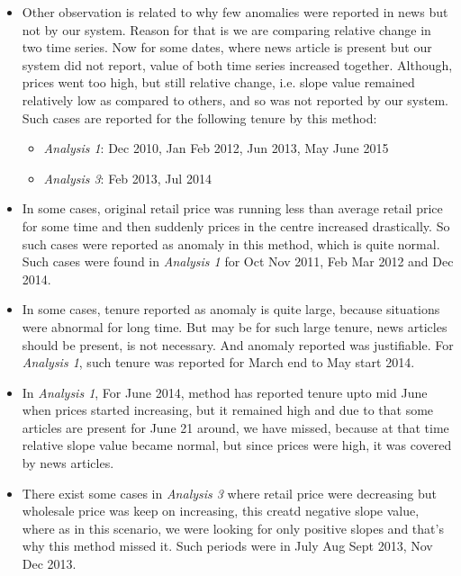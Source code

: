 \documentclass[a4paper,10pt]{report}
\begin{document}
\begin{itemize}
			\item Other observation is related to why few anomalies were reported in news but not by our system. Reason for that is we are comparing relative change in two time series. Now for some dates, where news article is present but our system did not report, value of both time series increased together. Although, prices went too high, but still relative change, i.e. slope value remained relatively low as compared to others, and so was not reported by our system.
			Such cases are reported for the following tenure by this method:
			\begin{itemize}
				\item \textit{Analysis 1}: Dec 2010, Jan Feb 2012, Jun 2013, May June 2015
				\item \textit{Analysis 3}: Feb 2013, Jul 2014
			\end{itemize}
			
			\item In some cases, original retail price was running less than average retail price for some time and then suddenly prices in the centre increased drastically. So such cases were reported as anomaly in this method, which is quite normal. Such cases were found in \textit{Analysis 1} for Oct Nov 2011, Feb Mar 2012 and Dec 2014.
			
			\item In some cases, tenure reported as anomaly is quite large, because situations were abnormal for long time. But may be for such large tenure, news articles should be present, is not necessary. And anomaly reported was justifiable. For\textit{ Analysis 1}, such tenure was reported for March end to May start 2014.
			
			\item In \textit{Analysis 1}, For June 2014, method has reported tenure upto mid June when prices started increasing, but it remained high and due to that some articles are present for June 21 around, we have missed, because at that time relative slope value became normal, but since prices were high, it was covered by news articles.
			
			\item There exist some cases in \textit{Analysis 3} where retail price were decreasing but wholesale price was keep on increasing, this creatd negative slope value, where as in this scenario, we were looking for only positive slopes and that's why this method missed it. Such periods were in July Aug Sept 2013, Nov Dec 2013.
			
		\end{itemize}
		
\end{document}
